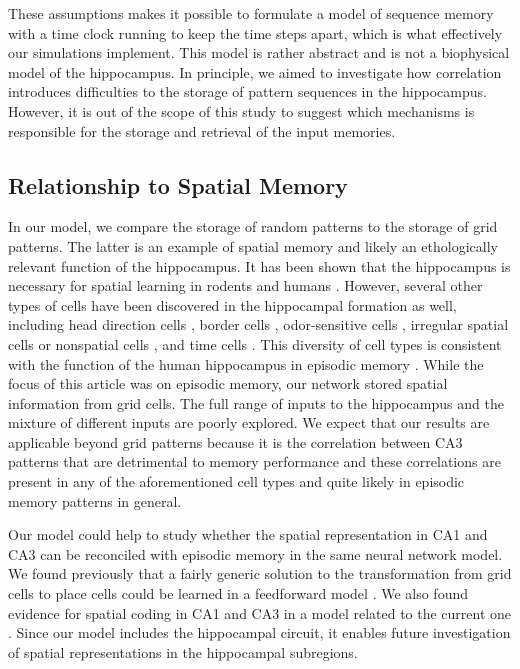 \documentclass[utf8]{frontiersSCNS} %
\begin{document}
%
These assumptions makes it possible to formulate a model of sequence memory with a time clock running to keep the time steps apart, which is what effectively our simulations implement. 
%
This model is rather abstract and is not a biophysical model of the hippocampus. In principle, we aimed to investigate how correlation introduces difficulties to the storage of pattern sequences in the hippocampus.
However, it is out of the scope of this study to suggest which mechanisms is responsible for the storage and retrieval of the input memories.   


\subsection{Relationship to Spatial Memory}
In our model, we compare the storage of random patterns to the storage of grid patterns. The latter is an example of spatial memory and likely an ethologically relevant function of the hippocampus. It has been shown that the  hippocampus is necessary for spatial learning in rodents \citep{morris1982place} and humans \citep{burgess2002human}.  However, several other types of cells have been discovered in the hippocampal formation as well, including head direction cells \citep{taube1990head}, border cells \citep{solstad2008representation}, odor-sensitive cells \citep{deshmukh2003representation}, irregular spatial cells or nonspatial cells \citep{zhang2013optogenetic}, and time cells \citep{macdonald2011hippocampal, salz2016time}. This diversity of cell types is consistent with the function of the human hippocampus in episodic memory \citep{burgess2002human}. While the focus of this article was on episodic memory, our network stored spatial information from grid cells. The full range of inputs to the hippocampus and the mixture of different inputs are poorly explored. We expect that our results are applicable beyond grid patterns because it is the correlation between CA3 patterns that are detrimental to memory performance and these correlations are present in any of the aforementioned cell types and quite likely in episodic memory patterns in general.

Our model could help to study whether the spatial representation in CA1 and CA3 can be reconciled with episodic memory in the same neural network model. We found previously that a fairly generic solution to the transformation from grid cells to place cells could be learned in a feedforward model \citep{cheng2011structure}. We also found evidence for spatial coding in CA1 and CA3 in a model related to the current one \citep{neher2015memory}. Since our model includes the hippocampal circuit, it enables future investigation of spatial representations in the hippocampal subregions. 
\end{document}
